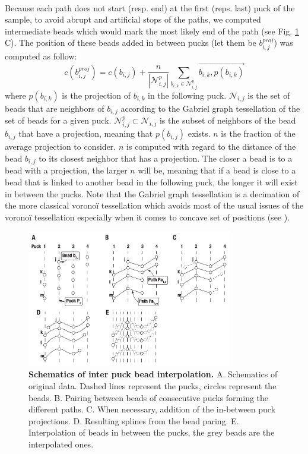 \documentclass[10pt,a4paper]{article}
\begin{document}
\paragraph{}Because each path does not start (resp. end) at the first (reps. last) puck of the sample, to avoid abrupt and artificial stops of the paths, we computed intermediate beads which would mark the most likely end of the path (see Fig. \ref{fig:interp} C). The position of these beads added in between pucks (let them be \(b^{proj}_{i,j}\)) was computed as follow:
\begin{equation}\label{eq:proj}
c(b^{proj}_{i,j})=c({b_{i,j}})+\frac{n}{|\mathcal{N}^p_{i,j}|}\sum_{b_{i,k}\in \mathcal{N}^p_{i,j}}\overrightarrow{b_{i,k},p(b_{i,k})}
\end{equation}
where \(p(b_{i,k})\) is the projection of \(b_{i,k}\) in the following puck. \(\mathcal{N}_{i,j}\) is the set of beads that are neighbors of \(b_{i,j}\) according to the Gabriel graph tessellation of the set of beads for a given puck.
\(\mathcal{N} ^p_{i,j}\subset \mathcal{N}_{i,j}\) is the subset of neighbors of the bead \(b_{i,j}\) that have a projection, meaning that \(p(b_{i,j})\) exists.
\(n\) is the fraction of the average projection to consider. \(n\) is computed with regard to the distance of the bead \(b_{i,j}\) to its closest neighbor that has a projection.
The closer a bead is to a bead with a projection, the larger \(n\) will be, meaning that if a bead is close to a bead that is linked to another bead in the following puck, the longer it will exist in between the pucks.
Note that the Gabriel graph tessellation is a decimation of the more classical vorono\"i tessellation which avoids most of the usual issues of the vorono\"i tessellation especially when it comes to concave set of positions (see \cite{mcdole:2018}).
\begin{figure}
\center
\includegraphics[width=0.8\textwidth]{figures/interpolation}
\caption{\textbf{Schematics of inter puck bead interpolation.} A. Schematics of original data. Dashed lines represent the pucks, circles represent the beads. B. Pairing between beads of consecutive pucks forming the different paths. C. When necessary, addition of the in-between puck projections. D. Resulting splines from the bead paring. E. Interpolation of beads in between the pucks, the grey beads are the interpolated ones.}\label{fig:interp}
\end{figure}
\end{document}
